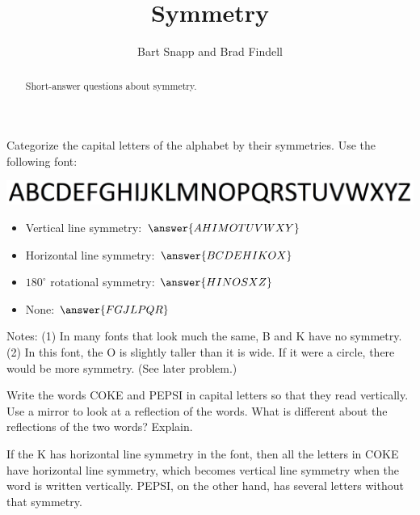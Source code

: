 \documentclass[nooutcomes]{ximera}
\title{Symmetry}
\author{Bart Snapp and Brad Findell}
\begin{document}
\begin{abstract}
Short-answer questions about symmetry. 
\end{abstract}
\maketitle

\begin{question}
Categorize the capital letters of the alphabet by their symmetries.  Use the following font: 
\begin{image}
\includegraphics{alphabet.png}
\end{image}
\begin{itemize}
\item Vertical line symmetry:  $\answer{AHIMOTUVWXY}$
\item Horizontal line symmetry:  $\answer{BCDEHIKOX}$  
\item $180^\circ$ rotational symmetry: $\answer{HINOSXZ}$
\item None: $\answer{FGJLPQR}$
\end{itemize}
\begin{feedback}[correct]
Notes:  (1) In many fonts that look much the same, B and K have no symmetry.  (2) In this font, the O is slightly taller than it is wide.  If it were a circle, there would be more symmetry.  (See later problem.)
\end{feedback}
\end{question}

\begin{question}
Write the words COKE and PEPSI in capital letters so that they read vertically.  Use a mirror to look at a reflection of the words.  What is different about the reflections of the two words?  Explain.  
\begin{freeResponse}
\end{freeResponse}
\begin{feedback}
If the K has horizontal line symmetry in the font, then all the letters in COKE have horizontal line symmetry, which becomes vertical line symmetry when the word is written vertically. PEPSI, on the other hand, has several letters without that symmetry.  
\end{feedback}
\end{question}
\end{document}
